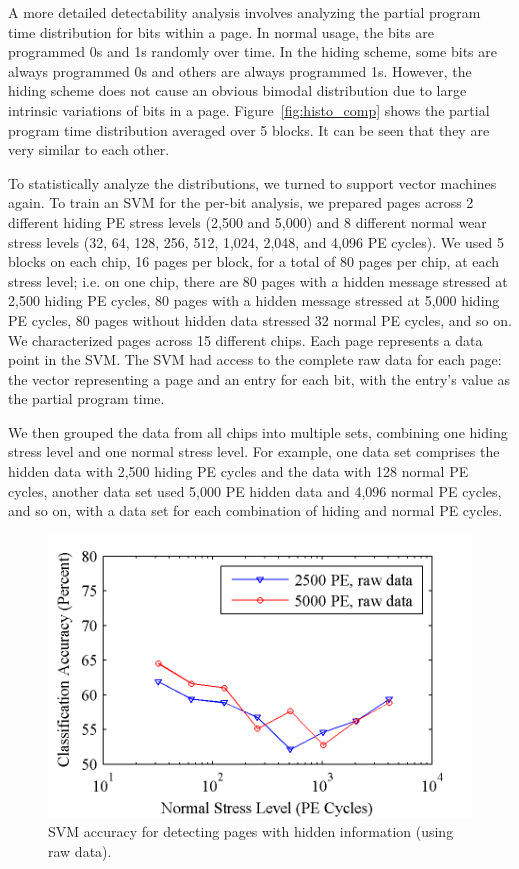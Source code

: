 A more detailed detectability analysis involves analyzing the partial program
time distribution for bits within a page. In normal usage, the bits are
programmed 0s and 1s randomly over time. In the hiding scheme, some bits are
always programmed 0s and others are always programmed 1s. However, the hiding
scheme does not cause an obvious bimodal distribution due to large intrinsic
variations of bits in a page. Figure~\ref{fig:histo_comp} shows the partial
program time distribution averaged over 5 blocks. It can be seen that they are
very similar to each other.

To statistically analyze the distributions, we turned to support vector
machines again. To train an SVM for the per-bit analysis,
we prepared pages across 2 different hiding PE stress levels (2,500 and 5,000)
and 8 different normal wear stress levels (32, 64, 128, 256, 512, 1,024, 2,048, and 
4,096 PE cycles). We used 5 blocks on each chip, 16 pages per block, for a total
of 80 pages per chip, at each stress level; i.e. on one
chip, there are 80 pages with a hidden message stressed at 2,500 hiding PE
cycles, 80 pages with a hidden message stressed at 5,000 hiding PE cycles, 80
pages without hidden data stressed 32 normal PE cycles, and so on. We
characterized pages across 15 different chips. Each page represents a data
point in the SVM. The SVM had access to the complete raw data for each page: the
vector representing a page and an entry for each bit, with the entry's value as
the partial program time.

We then grouped the data from all chips into multiple sets, combining one hiding 
stress level and one normal stress level.
For example, one data set comprises the hidden data with 2,500 hiding PE
cycles and the data with 128 normal PE cycles, another data set used 5,000 PE
hidden data and 4,096 normal PE cycles, and so on, with a data set for each
combination of hiding and normal PE cycles.

\begin{figure} 
\begin{center} 
\includegraphics[width=\mywidth]{figs/svm_rawdata.png} 
\caption{SVM accuracy for detecting pages with hidden information (using raw data).}
\label{fig:svm_acc1} 
\vspace{-0.1in}
\end{center} 
\end{figure}

